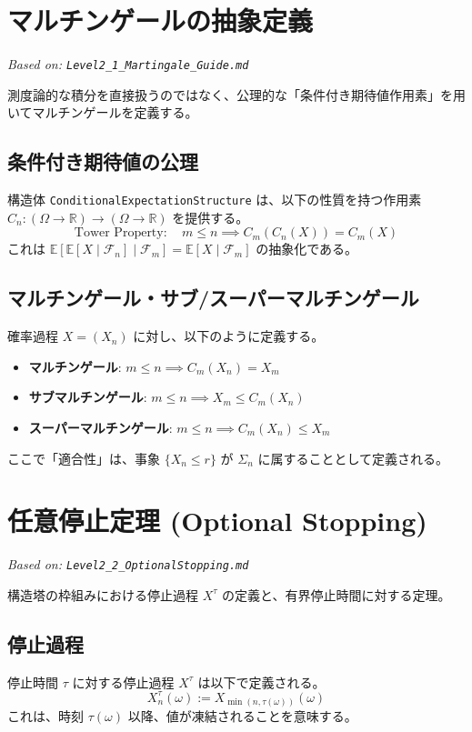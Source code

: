 \documentclass[a4paper,11pt]{ltjsarticle}
\theoremstyle{definition}
\newcommand{\R}{\mathbb{R}}
\newcommand{\OmegaSpace}{\Omega}
\newcommand{\F}{\mathcal{F}}
\newcommand{\Expect}{\mathbb{E}}
\newcommand{\CondExp}[2]{\Expect[#1 \mid #2]}
\newcommand{\Tau}{\tau}
\begin{document}
\section{マルチンゲールの抽象定義}
\label{sec:martingale}
\textit{Based on: \texttt{Level2\_1\_Martingale\_Guide.md}}

測度論的な積分を直接扱うのではなく、公理的な「条件付き期待値作用素」を用いてマルチンゲールを定義する。

\subsection{条件付き期待値の公理}
構造体 \texttt{ConditionalExpectationStructure} は、以下の性質を持つ作用素 $C_n: (\OmegaSpace \to \R) \to (\OmegaSpace \to \R)$ を提供する。
\[ \text{Tower Property}: \quad m \le n \implies C_m(C_n(X)) = C_m(X) \]
これは $\CondExp{\CondExp{X}{\F_n}}{\F_m} = \CondExp{X}{\F_m}$ の抽象化である。

\subsection{マルチンゲール・サブ/スーパーマルチンゲール}
確率過程 $X = (X_n)$ に対し、以下のように定義する。
\begin{itemize}
    \item \textbf{マルチンゲール}: $m \le n \implies C_m(X_n) = X_m$
    \item \textbf{サブマルチンゲール}: $m \le n \implies X_m \le C_m(X_n)$
    \item \textbf{スーパーマルチンゲール}: $m \le n \implies C_m(X_n) \le X_m$
\end{itemize}
ここで「適合性」は、事象 $\{X_n \le r\}$ が $\Sigma_n$ に属することとして定義される。

\section{任意停止定理 (Optional Stopping)}
\label{sec:ost}
\textit{Based on: \texttt{Level2\_2\_OptionalStopping.md}}

構造塔の枠組みにおける停止過程 $X^\Tau$ の定義と、有界停止時間に対する定理。

\subsection{停止過程}
停止時間 $\Tau$ に対する停止過程 $X^\Tau$ は以下で定義される。
\[ X^\Tau_n(\omega) := X_{\min(n, \Tau(\omega))}(\omega) \]
これは、時刻 $\Tau(\omega)$ 以降、値が凍結されることを意味する。
\end{document}
